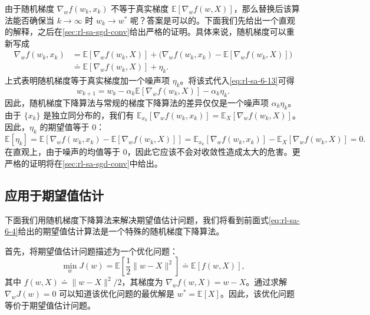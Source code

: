 由于随机梯度 $\nabla_w f(w_k, x_k)$ 不等于真实梯度 $\mathbb{E}[\nabla_w f(w, X)]$，那么替换后该算法能否确保当 $k \to \infty$ 时 $w_k \to w^*$ 呢？答案是可以的。下面我们先给出一个直观的解释，之后在\cref{sec:rl-sa-sgd-conv}给出严格的证明。具体来说，随机梯度可以重新写成
\begin{equation}
\begin{aligned}
\nabla_w f(w_k, x_k) &= \mathbb{E}[\nabla_w f(w_k, X)] + \Big( \nabla_w f(w_k, x_k) - \mathbb{E}[\nabla_w f(w_k, X)] \Big) \\
&\doteq \mathbb{E}[\nabla_w f(w_k, X)] + \eta_k.
\end{aligned}
\end{equation}
上式表明随机梯度等于真实梯度加一个噪声项 $\eta_k$。将该式代入\eqref{eq:rl-sa-6-13}可得
\begin{equation}
w_{k+1} = w_k - \alpha_k \mathbb{E}[\nabla_w f(w_k, X)] - \alpha_k \eta_k.
\end{equation}
因此，随机梯度下降算法与常规的梯度下降算法的差异仅仅是一个噪声项 $\alpha_k \eta_k$。由于 $\{x_k\}$ 是独立同分布的，我们有 $\mathbb{E}_{x_k}[\nabla_w f(w_k, x_k)] = \mathbb{E}_X[\nabla_w f(w_k, X)]$。因此，$\eta_k$ 的期望值等于 0：
\begin{equation}
\mathbb{E}[\eta_k] = \mathbb{E}\left[ \nabla_w f(w_k, x_k) - \mathbb{E}[\nabla_w f(w_k, X)] \right] = \mathbb{E}_{x_k}[\nabla_w f(w_k, x_k)] - \mathbb{E}_X[\nabla_w f(w_k, X)] = 0.
\end{equation}
在直观上，由于噪声的均值等于 0，因此它应该不会对收敛性造成太大的危害。更严格的证明将在\cref{sec:rl-sa-sgd-conv}中给出。

\subsection{应用于期望值估计}
\label{sec:rl-sa-sgd-mean}

下面我们用随机梯度下降算法来解决期望值估计问题，我们将看到前面式\eqref{eq:rl-sa-6-4}给出的期望值估计算法是一个特殊的随机梯度下降算法。

首先，将期望值估计问题描述为一个优化问题：
\begin{equation}
\min_w J(w) = \mathbb{E}\left[ \frac{1}{2} \| w - X \|^2 \right] \doteq \mathbb{E}[f(w, X)],
\label{eq:rl-sa-6-14}
\end{equation}
其中 $f(w, X) \doteq \| w - X \|^2 / 2$，其梯度为 $\nabla_w f(w, X) = w - X$。通过求解 $\nabla_w J(w) = 0$ 可以知道该优化问题的最优解是 $w^* = \mathbb{E}[X]$。因此，该优化问题等价于期望值估计问题。

